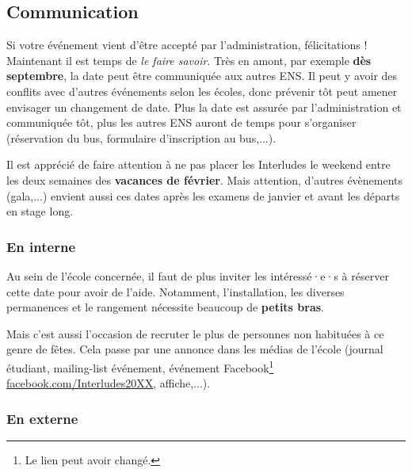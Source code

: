 \subsection{Communication}

Si votre événement vient d'être accepté par l'administration, félicitations ! Maintenant il est temps de \emph{le faire savoir}. Très en amont, par exemple \textbf{dès septembre}, la date peut être communiquée aux autres ENS. Il peut y avoir des conflits avec d'autres événements selon les écoles, donc prévenir tôt peut amener envisager un changement de date. Plus la date est assurée par l'administration et communiquée tôt, plus les autres ENS auront de temps pour s'organiser (réservation du bus, formulaire d'inscription au bus,...).

\begin{Asavoir}
Il est apprécié de faire attention à ne pas placer les Interludes le weekend entre les deux semaines des \textbf{vacances de février}. Mais attention, d'autres évènements (gala,...) envient aussi ces dates après les examens de janvier et avant les départs en stage long.
\end{Asavoir}

\subsubsection*{En interne}

Au sein de l'école concernée, il faut de plus inviter les intéressé·e·s à réserver cette date pour avoir de l'aide. Notamment, l'installation, les diverses permanences et le rangement nécessite beaucoup de \textbf{petits bras}.

Mais c'est aussi l'occasion de recruter le plus de personnes non habituées à ce genre de fêtes. Cela passe par une annonce dans les médias de l'école (journal étudiant, mailing-list événement, événement Facebook\footnote{Le lien peut avoir changé.} \href{https://www.facebook.com/Interludes2020/}{facebook.com/Interludes20XX},  affiche,...).

\subsubsection*{En externe}

